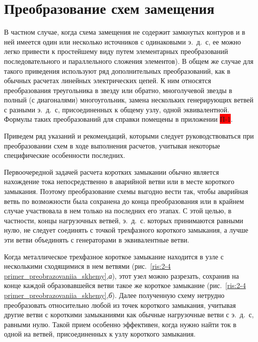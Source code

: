 \section{Преобразование схем замещения}
\label{sec:2-5 preobrazovanie_skhem_zameshcheniia}

В частном случае, когда схема замещения не содержит замкнутых контуров и в ней имеется один или несколько источников с одинаковыми э.~д.~с, ее можно легко привести к простейшему виду путем элементарных преобразований последовательного и параллельного сложения элементов). В общем же случае для такого приведения используют ряд дополнительных преобразований, как в обычных расчетах линейных электрических цепей. К ним относятся преобразования треугольника в звезду или обратно, многолучевой звезды в полный (с диагоналями) многоугольник, замена нескольких генерирующих ветвей с разными э.~д.~с, присоединенных к общему узлу, одной эквивалентной. Формулы таких преобразований для справки помещены в приложении \colorbox{red}{П-1}.

Приведем ряд указаний и рекомендаций, которыми следует руководствоваться при преобразовании схем в ходе выполнения расчетов, учитывая некоторые специфические особенности последних.

Первоочередной задачей расчета коротких замыкании обычно является нахождение тока непосредственно в аварийной ветви или в месте короткого замыкания. Поэтому преобразование схемы выгодно вести так, чтобы аварийная ветвь по возможности была сохранена до конца преобразования или в крайнем случае участвовала в нем только на последних его этапах. С этой целью, в частности, концы нагрузочных ветвей, э.~д.~с. которых принимаются равными нулю, не следует соединять с точкой трехфазного короткого замыкания, а лучше эти ветви объединять с генераторами в эквивалентные ветви.

Когда металлическое трехфазное короткое замыкание находится в узле с несколькими сходящимися в нем ветвями (рис.~\ref{ris:2-4 primer_preobrazovaniia_skhemy},\textit{а}), этот узел можно разрезать, сохранив на конце каждой образовавшейся ветви такое же короткое замыкание (рис.~\ref{ris:2-4 primer_preobrazovaniia_skhemy},\textit{б}). Далее полученную схему нетрудно преобразовать относительно любой из точек короткого замыкания, учитывая другие ветви с короткими замыканиями как обычные нагрузочные ветви с э.~д.~с, равными нулю. Такой прием особенно эффективен, когда нужно найти ток в одной иа ветвей, присоединенных к узлу короткого замыкания.

